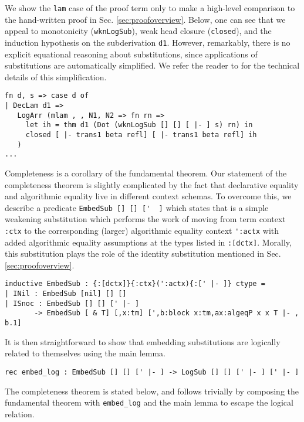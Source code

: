\documentclass[copyright,creativecommons]{eptcs}
\begin{document}
We show the \lstinline{lam} case of the proof term only to make a high-level
comparison to the hand-written proof in
Sec. \ref{sec:proofoverview}. Below, one can see that we appeal to
monotonicity (\lstinline{wknLogSub}), weak head closure
(\lstinline{closed}), and the induction hypothesis on the subderivation
\lstinline{d1}. However, remarkably, there is no explicit equational reasoning
about substitutions, since applications of substitutions are
automatically simplified. We refer the reader to \cite{Cave:LFMTP13}
for the technical details of this simplification.

\begin{lstlisting}
fn d, s => case d of
| DecLam d1 =>
   LogArr (mlam , , N1, N2 => fn rn =>
     let ih = thm d1 (Dot (wknLogSub [] [] [ |- ] s) rn) in
     closed [ |- trans1 beta refl] [ |- trans1 beta refl] ih
   )
...
\end{lstlisting}

Completeness is a corollary of the fundamental theorem. Our statement
of the completeness theorem is slightly complicated by the fact that
declarative equality and algorithmic equality live in different
context schemas. To overcome this, we describe a predicate \lstinline{EmbedSub [] [] ['  ]} which states that
 is a simple weakening substitution which performs the work of
moving from term context \lstinline{:ctx} to the corresponding
(larger) algorithmic equality context \lstinline{':actx} with added algorithmic equality
assumptions at the types listed in \lstinline{:[dctx]}. Morally,
this  substitution plays the role of the identity substitution mentioned in
Sec. \ref{sec:proofoverview}.

\begin{lstlisting}
inductive EmbedSub : {:[dctx]}{:ctx}(':actx){:[' |- ]} ctype =
| INil : EmbedSub [nil] [] []
| ISnoc : EmbedSub [] [] [' |- ]
       -> EmbedSub [ & T] [,x:tm] [',b:block x:tm,ax:algeqP x x T |- , b.1]
\end{lstlisting}

It is then straightforward to show that embedding substitutions 
are logically related to themselves using the main lemma.

\begin{lstlisting}
rec embed_log : EmbedSub [] [] [' |- ] -> LogSub [] [] [' |- ] [' |- ]
\end{lstlisting}

The completeness theorem is stated below, and follows trivially by
composing the fundamental theorem with \lstinline{embed_log} and the main lemma to escape the logical relation.
\end{document}
